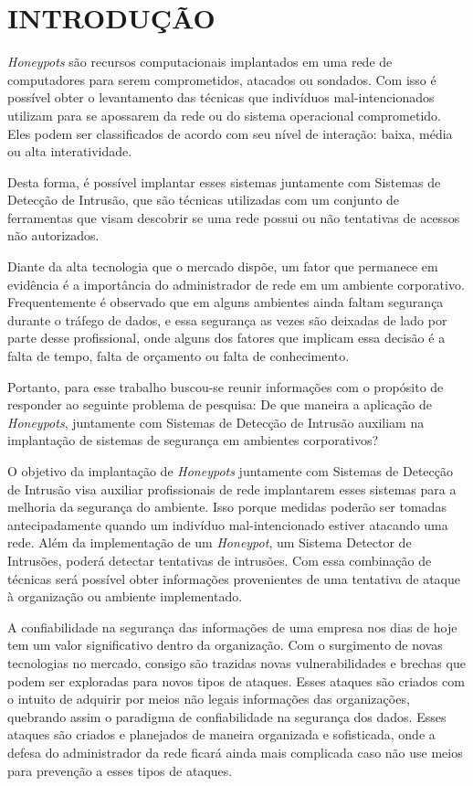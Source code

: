 \chapter{INTRODUÇÃO}
\textit{Honeypots} são recursos computacionais implantados em uma rede de computadores para serem comprometidos, atacados ou sondados. Com isso é possível obter o levantamento das técnicas que indivíduos mal-intencionados utilizam para se apossarem da rede ou do sistema operacional comprometido. Eles podem ser classificados de acordo com seu nível de interação: baixa, média ou alta interatividade.

Desta forma, é possível implantar esses sistemas juntamente com Sistemas de Detecção de Intrusão, que são técnicas utilizadas com um conjunto de ferramentas que visam descobrir se uma rede possui ou não tentativas de acessos não autorizados.

Diante da alta tecnologia que o mercado dispõe, um fator que permanece em evidência é a importância do administrador de rede em um ambiente corporativo. Frequentemente é observado que em alguns ambientes ainda faltam segurança durante o tráfego de dados, e essa segurança as vezes são deixadas de lado por parte desse profissional, onde alguns dos fatores que implicam essa decisão é a falta de tempo, falta de orçamento ou falta de conhecimento.

Portanto, para esse trabalho buscou-se reunir informações com o propósito de responder ao seguinte problema de pesquisa: De que maneira a aplicação de \textit{Honeypots}, juntamente com Sistemas de Detecção de Intrusão auxiliam na implantação de sistemas de segurança em ambientes corporativos?

O objetivo da implantação de \textit{Honeypots} juntamente com Sistemas de Detecção de Intrusão visa auxiliar profissionais de rede implantarem esses sistemas para a melhoria da segurança do ambiente. Isso porque medidas poderão ser tomadas antecipadamente quando um indivíduo mal-intencionado estiver atacando uma rede. Além da implementação de um \textit{Honeypot}, um Sistema Detector de Intrusões, poderá detectar tentativas de intrusões. Com essa combinação de técnicas será possível obter informações provenientes de uma tentativa de ataque à organização ou ambiente implementado.

A confiabilidade na segurança das informações de uma empresa nos dias de hoje tem um valor significativo dentro da organização. Com o surgimento de novas tecnologias no mercado, consigo são trazidas novas vulnerabilidades e brechas que podem ser exploradas para novos tipos de ataques. Esses ataques são criados com o intuito de adquirir por meios não legais informações das organizações, quebrando assim o paradigma de confiabilidade na segurança dos dados. Esses ataques são criados e planejados de maneira organizada e sofisticada, onde a defesa do administrador da rede ficará ainda mais complicada caso não use meios para prevenção a esses tipos de ataques.

